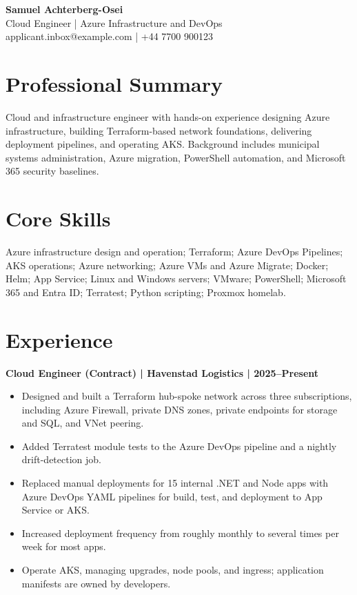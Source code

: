 \documentclass[11pt,a4paper]{article}
\begin{document}
\begin{center}
{\Huge\bfseries\color{primarycolor} Samuel Achterberg-Osei}\\[0.3em]
{\large\color{accentcolor} Cloud Engineer | Azure Infrastructure and DevOps}\\[0.2em]
applicant.inbox@example.com | +44 7700 900123
\end{center}

\section*{Professional Summary}
Cloud and infrastructure engineer with hands-on experience designing Azure infrastructure, building Terraform-based network foundations, delivering deployment pipelines, and operating AKS. Background includes municipal systems administration, Azure migration, PowerShell automation, and Microsoft 365 security baselines.

\section*{Core Skills}
Azure infrastructure design and operation; Terraform; Azure DevOps Pipelines; AKS operations; Azure networking; Azure VMs and Azure Migrate; Docker; Helm; App Service; Linux and Windows servers; VMware; PowerShell; Microsoft 365 and Entra ID; Terratest; Python scripting; Proxmox homelab.

\section*{Experience}
\textbf{Cloud Engineer (Contract) | Havenstad Logistics | 2025–Present}
\begin{itemize}
\item Designed and built a Terraform hub-spoke network across three subscriptions, including Azure Firewall, private DNS zones, private endpoints for storage and SQL, and VNet peering.
\item Added Terratest module tests to the Azure DevOps pipeline and a nightly drift-detection job.
\item Replaced manual deployments for 15 internal .NET and Node apps with Azure DevOps YAML pipelines for build, test, and deployment to App Service or AKS.
\item Increased deployment frequency from roughly monthly to several times per week for most apps.
\item Operate AKS, managing upgrades, node pools, and ingress; application manifests are owned by developers.
\end{itemize}
\end{document}
